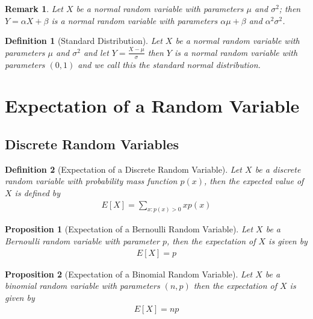\documentclass[11pt, oneside]{book}   	%
\newtheorem{definition}{Definition}[chapter]
\newtheorem{remark}{Remark}[chapter]
\newtheorem{proposition}{Proposition}[chapter]
\begin{document}
\begin{spacing}{1.618}
\begin{remark}
	Let $X$ be a normal random variable with parameters $\mu$ and $\sigma^2$; then $Y=\alpha X+\beta$ is a normal random variable with parameters $\alpha\mu+\beta$ and $\alpha^2\sigma^2$. 
\end{remark}

\begin{definition}[Standard Distribution]
	Let $X$ be a normal random variable with parameters $\mu$ and $\sigma^2$ and let $Y=\frac{X-\mu}{\sigma}$ then $Y$ is a normal random variable with parameters $(0, 1)$ and we call this the standard normal distribution. 
\end{definition}

\section{Expectation of a Random Variable}

\subsection{Discrete Random Variables}

\begin{definition}[Expectation of a Discrete Random Variable]
	Let $X$ be a discrete random variable with probability mass function $p(x)$, then the \emph{expected value} of $X$ is defined by
	\begin{alignat}{4}
		E[X]=\sum_{x:p(x)>0} xp(x)
	\end{alignat}
\end{definition}

\begin{proposition}[Expectation of a Bernoulli Random Variable]
	Let $X$ be a Bernoulli random variable with parameter $p$, then the expectation of $X$ is given by
	\begin{alignat}{4}
		E[X]=p
	\end{alignat}
\end{proposition}

\begin{proposition}[Expectation of a Binomial Random Variable]
	Let $X$ be a binomial random variable with parameters $(n, p)$ then the expectation of $X$ is given by 
	\begin{alignat}{4}
		E[X]=np
	\end{alignat}
\end{proposition}


\end{spacing}
\end{document}
